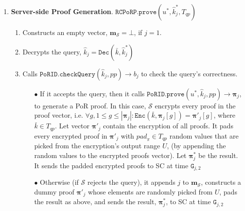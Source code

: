 \begin{enumerate}
\

\item\textbf{Server-side Proof Generation}. $\mathtt{RCPoRP}.\mathtt{prove}(u^{\scriptscriptstyle *},  \hat{k}^{\scriptscriptstyle *}_{\scriptscriptstyle j}, T_{\scriptscriptstyle qp})$


\begin{enumerate}

\item Constructs an empty  vector, $\bm{m}_{\scriptscriptstyle\mathcal S}=\bot$, if $j=1$.  

\item Decrypts the query, $\hat{k}_{\scriptscriptstyle j}=\mathtt{Dec}(\bar{k},\hat{k}^{\scriptscriptstyle *}_{\scriptscriptstyle j})$

\item Calls $\mathtt{PoRID.checkQuery}(\hat{k}_{\scriptscriptstyle j}, pp)\rightarrow b_{\scriptscriptstyle j}$ to check the query's correctness.

\begin{itemize}
\item[$\bullet$] If it accepts the query, then it calls $\mathtt{PoRID.prove}(u^{\scriptscriptstyle *},\hat{k}_{\scriptscriptstyle j},pp)\rightarrow  {\bm{\pi}}_{\scriptscriptstyle j}$, to generate a PoR  proof. In this case,  $\mathcal S$ encrypts every  proof in the proof vector, i.e. $\forall g, 1\leq g\leq| {\bm{\pi}}_{\scriptscriptstyle j}|: \mathtt{Enc}(\bar{k}, {\bm{\pi}}_{\scriptscriptstyle j}[g])= {\bm{\pi}}'_{\scriptscriptstyle j}[g]$, where $\bar{k}\in T_{\scriptscriptstyle qp}$. Let vector $ {\bm{\pi}}'_{\scriptscriptstyle j}$ contain the encryption of all proofs. It pads every encrypted proof in $ {\bm{\pi}}'_{\scriptscriptstyle j}$ with ${pad}_{\scriptscriptstyle \pi}\in T_{\scriptscriptstyle qp}$ random values that are picked from the encryption's output range $U$, (by appending the random values to the encrypted proofs vector). Let $\bm{\pi}^{\scriptscriptstyle *}_{\scriptscriptstyle j}$ be the result. It sends the padded encrypted proofs  to SC at time $\texttt{G}_{\scriptscriptstyle j,2}$ 
\item[$\bullet$] Otherwise (if $\mathcal S$ rejects the query), it appends $j$  to $ {\bm{m}}_{\scriptscriptstyle\mathcal{S}}$,  constructs a dummy proof $ {\bm{\pi}}'_{\scriptscriptstyle j}$ whose elements are randomly picked from $U$,  pads the result as above, and sends the result, $\bm{\pi}^{\scriptscriptstyle *}_{\scriptscriptstyle j}$, to SC at time $\texttt{G}_{\scriptscriptstyle j,2}$


\end{itemize}
\end{enumerate}
\end{enumerate}
